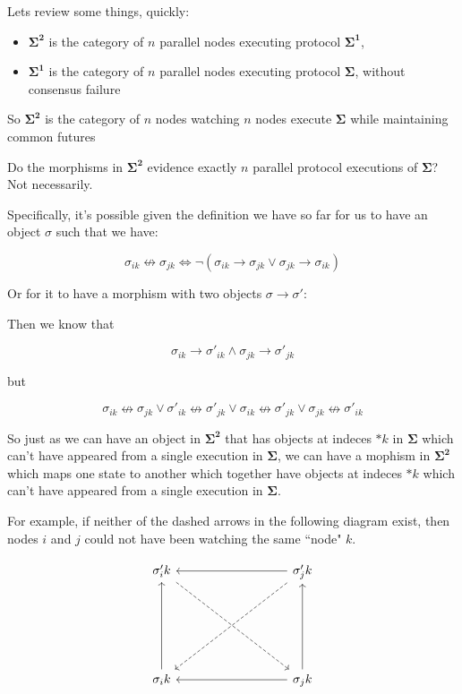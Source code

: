 \documentclass{article}
\theoremstyle{definition}
\newcommand{\cat}{
	\mathbf
}
\begin{document}
Lets review some things, quickly: 

\begin{itemize}
\item $\cat{\Sigma^2}$ is the category of $n$ parallel nodes executing protocol $\cat{\Sigma^1}$,
\item $\cat{\Sigma^1}$ is the category of $n$ parallel nodes executing protocol $\cat{\Sigma}$, without consensus failure 
\end{itemize}

So  $\cat{\Sigma^2}$ is the category of $n$ nodes watching $n$ nodes execute $\cat{\Sigma}$ while maintaining common futures

Do the morphisms in $\cat{\Sigma^2}$ evidence exactly $n$ parallel protocol executions of $\cat{\Sigma}$? Not necessarily. 

Specifically, it's possible given the definition we have so far for us to have an object $\sigma$ such that we have:

$$
\sigma_{ik} \nleftrightarrow \sigma_{jk} \iff \neg{(\sigma_{ik} \to \sigma_{jk} \lor \sigma_{jk} \to \sigma_{ik})}
$$

Or for it to have a morphism with two objects $\sigma \to \sigma'$:

Then we know that 

$$
\sigma_{ik} \to \sigma'_{ik} \land \sigma_{jk} \to \sigma'_{jk} 
$$

but 

$$
\sigma_{ik} \nleftrightarrow \sigma_{jk} \lor \sigma'_{ik} \nleftrightarrow \sigma'_{jk} \lor \sigma_{ik} \nleftrightarrow \sigma'_{jk} \lor \sigma_{jk} \nleftrightarrow \sigma'_{ik}
$$

So just as we can have an object in $\cat{\Sigma^2}$ that has objects at indeces $*k$ in $\cat{\Sigma}$ which can't have appeared from a single execution in $\cat{\Sigma}$, we can have a mophism in $\cat{\Sigma^2}$ which maps one state to another which together have objects at indeces $*k$ which can't have appeared from a single execution in $\cat{\Sigma}$.

For example, if neither of the dashed arrows in the following diagram exist, then nodes $i$ and $j$ could not have been watching the same ``node" $k$.

\begin{equation*}
\begin{tikzcd}
\sigma'_ik
  \arrow[rrrddd,dashed]
  &
{}
  &
{}
  &
\sigma'_jk
  \arrow[lllddd,dashed]
  \arrow[lll,""]
  \\ 
{}
  &
{}
  &
{}%
  &
{}
  \\ 
{}
  &
{}
  &
{}%
  &
{}
  \\
\sigma_ik
  \arrow[uuu,""]
  &
{}
  &
{}%
  &
\sigma_jk
  \arrow[uuu,""]
  \arrow[lll,""]
\end{tikzcd}
\end{equation*}
\end{document}
